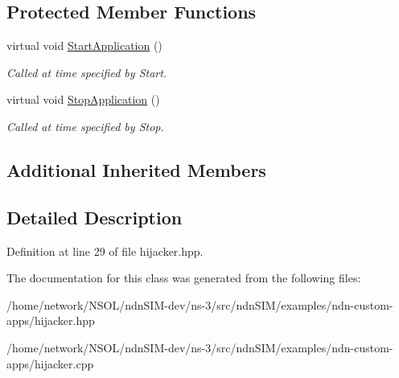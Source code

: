 \subsection*{Protected Member Functions}
\begin{DoxyCompactItemize}
\item 
virtual void \hyperlink{classns3_1_1Hijacker_aa1f5a2c762469e11341568f5c086c5ef}{Start\+Application} ()\hypertarget{classns3_1_1Hijacker_aa1f5a2c762469e11341568f5c086c5ef}{}\label{classns3_1_1Hijacker_aa1f5a2c762469e11341568f5c086c5ef}

\begin{DoxyCompactList}\small\item\em Called at time specified by Start. \end{DoxyCompactList}\item 
virtual void \hyperlink{classns3_1_1Hijacker_a7135c9e3105640218f93db107c315149}{Stop\+Application} ()\hypertarget{classns3_1_1Hijacker_a7135c9e3105640218f93db107c315149}{}\label{classns3_1_1Hijacker_a7135c9e3105640218f93db107c315149}

\begin{DoxyCompactList}\small\item\em Called at time specified by Stop. \end{DoxyCompactList}\end{DoxyCompactItemize}
\subsection*{Additional Inherited Members}


\subsection{Detailed Description}


Definition at line 29 of file hijacker.\+hpp.



The documentation for this class was generated from the following files\+:\begin{DoxyCompactItemize}
\item 
/home/network/\+N\+S\+O\+L/ndn\+S\+I\+M-\/dev/ns-\/3/src/ndn\+S\+I\+M/examples/ndn-\/custom-\/apps/hijacker.\+hpp\item 
/home/network/\+N\+S\+O\+L/ndn\+S\+I\+M-\/dev/ns-\/3/src/ndn\+S\+I\+M/examples/ndn-\/custom-\/apps/hijacker.\+cpp\end{DoxyCompactItemize}
